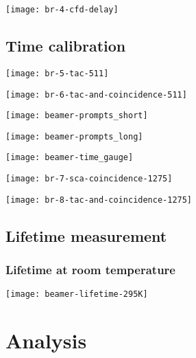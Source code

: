 \documentclass[english, fleqn]{beamer}
\newcommand\oscillatorSize{0.7}
\begin{document}
\begin{frame}
    \texttt{[image: br-4-cfd-delay]}
\end{frame}

\subsection{Time calibration}

\begin{frame}
    \texttt{[image: br-5-tac-511]}
\end{frame}

\begin{frame}
    \texttt{[image: br-6-tac-and-coincidence-511]}
\end{frame}

\begin{frame}
    \texttt{[image: beamer-prompts\_short]}
\end{frame}

\begin{frame}
    \texttt{[image: beamer-prompts\_long]}
\end{frame}

\begin{frame}
    \texttt{[image: beamer-time\_gauge]}
\end{frame}

\begin{frame}
    \texttt{[image: br-7-sca-coincidence-1275]}
\end{frame}

\begin{frame}
    \texttt{[image: br-8-tac-and-coincidence-1275]}
\end{frame}

\subsection{Lifetime measurement}

\begin{frame}
    \frametitle{Lifetime at room temperature}
    \texttt{[image: beamer-lifetime-295K]}
\end{frame}

\section{Analysis}
\end{document}
